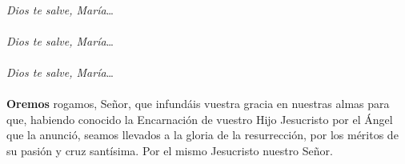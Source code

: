       \\[1mm]
      \textit{Dios te salve, María}\ldots\\[1mm]
      \\[1mm]
      \textit{Dios te salve, María}\ldots\\[1mm]
      \\[1mm]
      \textit{Dios te salve, María}\ldots\\[1mm]
      \ruegapornosotrossalve\\[2mm]
      \textbf{Oremos}
       rogamos, Señor, que infundáis vuestra gracia en nuestras almas para que,
      habiendo conocido la Encarnación de vuestro Hijo Jesucristo por el Ángel que la anunció,
      seamos llevados a la gloria de la resurrección, por los méritos de su pasión y cruz santísima.
      Por el mismo Jesucristo nuestro Señor.\\[1mm]
